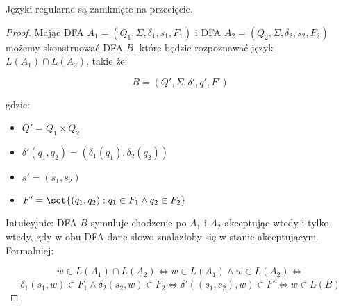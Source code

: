 \begin{theorem}
Języki regularne są zamknięte na przecięcie.
\end{theorem}
\begin{proof}
 Mając DFA \(A_1 = (Q_1, \Sigma, \delta_1, s_1, F_1)\) i DFA \(A_2 = (Q_2, \Sigma, \delta_2, s_2, F_2)\) możemy skonstruować DFA \(B\), które będzie rozpoznawać język \(L(A_1) \cap L(A_2)\), takie że:
 
 \[
    B = (Q', \Sigma, \delta', q', F')
 \]
 
 gdzie: 
 
 \begin{itemize}
     \item \( Q' = Q_1 \times Q_2 \)
     \item \( \delta'(q_1, q_2) = (\delta_1(q_1), \delta_2(q_2)) \)
     \item \( s' = (s_1, s_2) \)
     \item \( F' = \set{(q_1, q_2) : q_1 \in F_1 \land q_2 \in F_2} \)
     
 \end{itemize}
 
 Intuicyjnie: DFA \(B\) symuluje chodzenie po \(A_1\) i \(A_2\) akceptując wtedy i tylko wtedy, gdy w obu DFA dane słowo znalazłoby się w stanie akceptującym. Formalniej:
 
 \[ 
    w \in L(A_1) \cap L(A_2) \iff w \in L(A_1) \land w \in L(A_2) \iff  
 \]
 \[ 
    \tilde \delta_1(s_1, w) \in F_1 \land \tilde \delta_2(s_2, w) \in F_2 \iff \delta'((s_1, s_2), w) \in F' \iff w \in L(B) 
 \]
 
\end{proof}